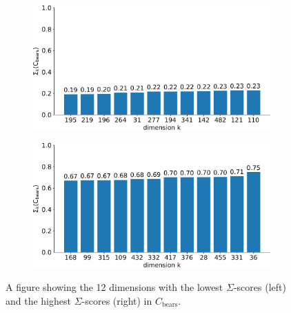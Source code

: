 \begin{figure}[thbp]
    \centering
    \begin{subfigure}{.49\textwidth}
        \centering
        \includegraphics[width=\linewidth]{figures/lowest_scores_barchart_ds19.pdf}
    \end{subfigure}
    \hfill
    \begin{subfigure}{.49\textwidth}
        \centering
        \includegraphics[width=\linewidth]{figures/highest_scores_barchart_ds19.pdf}
    \end{subfigure}
    \caption{A figure showing the 12 dimensions with the lowest $\Sigma$-scores (left) and the highest $\Sigma$-scores (right) in $C_{\text{bears}}$.}
    \label{fig:barcharts2}
\end{figure}

